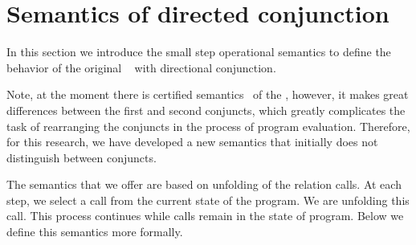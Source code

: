 \section{Semantics of directed conjunction}
In this section we introduce the small step operational semantics to define the behavior of the original \mk~ with directional conjunction.


Note, at the moment there is certified semantics~\cite{fair:semantics} of the \mk, however, it makes great differences between the first and second conjuncts, which greatly complicates the task of rearranging the conjuncts in the process of program evaluation.
Therefore, for this research, we have developed a new semantics that initially does not distinguish between conjuncts.


The semantics that we offer are based on unfolding of the relation calls.
At each step, we select a call from the current state of the program.
We are unfolding this call.
This process continues while calls remain in the state of program.
Below we define this semantics more formally.


